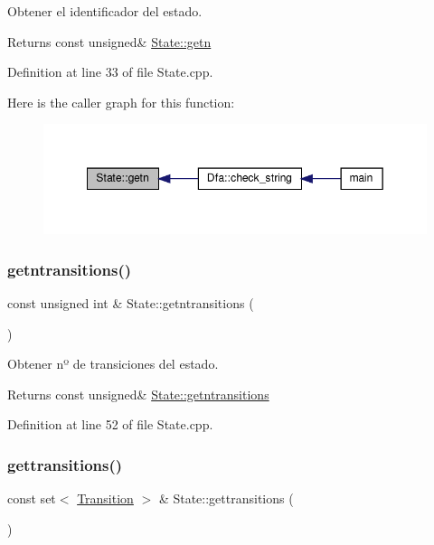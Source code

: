 Obtener el identificador del estado. 

\begin{DoxyReturn}{Returns}
const unsigned\& \hyperlink{class_state_ac045d201c81b6ea1ff3da734c6e286a7}{State\+::getn} 
\end{DoxyReturn}


Definition at line 33 of file State.\+cpp.

Here is the caller graph for this function\+:
\nopagebreak
\begin{figure}[H]
\begin{center}
\leavevmode
\includegraphics[width=349pt]{class_state_ac045d201c81b6ea1ff3da734c6e286a7_icgraph}
\end{center}
\end{figure}
\mbox{\label{class_state_ac6d5a2e94f19b88ef932f84380420b35}} 
\subsubsection{\texorpdfstring{getntransitions()}{getntransitions()}}
{\footnotesize\ttfamily const unsigned int \& State\+::getntransitions (\begin{DoxyParamCaption}{ }\end{DoxyParamCaption})}



Obtener nº de transiciones del estado. 

\begin{DoxyReturn}{Returns}
const unsigned\& \hyperlink{class_state_ac6d5a2e94f19b88ef932f84380420b35}{State\+::getntransitions} 
\end{DoxyReturn}


Definition at line 52 of file State.\+cpp.

\mbox{\label{class_state_aaafb1d7a01590d4b2ff055ca31028d65}} 
\subsubsection{\texorpdfstring{gettransitions()}{gettransitions()}}
{\footnotesize\ttfamily const set$<$ \hyperlink{class_transition}{Transition} $>$ \& State\+::gettransitions (\begin{DoxyParamCaption}{ }\end{DoxyParamCaption})}



